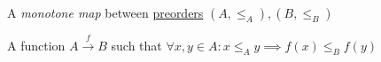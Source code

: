 
A \emph{monotone map} between \href{doc/1 math/Seven Sketches in Compositionality/1 Chapter 1: Generative Effects/Preorders/Preorder}{preorders} $(A, \leq_A), (B, \leq_B)$

A function $A \xrightarrow{f} B$ such that $\forall x,y \in A: x \leq_A y \implies f(x) \leq_B f(y)$